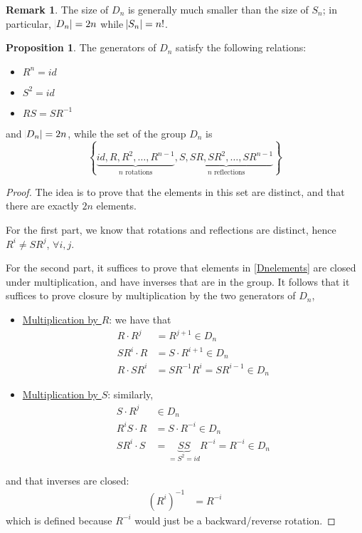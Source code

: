 \documentclass[11pt]{amsart} %
\theoremstyle{definition}
\newtheorem{proposition}[definition]{Proposition}
\theoremstyle{definition}
\newtheorem{remark}[definition]{Remark}
\numberwithin{equation}{section}
\begin{document}
\begin{remark}
	The size of $D_n$ is generally much smaller than the size of $S_n$; in particular, $\abs{D_n} = 2n$ while $\abs{S_n}=n!$.
\end{remark}

\begin{proposition}
	The generators of $D_n$ satisfy the following relations:
	\begin{itemize}%
		\item $R^n = id$
		\item $S^2 = id$
		\item $RS = SR^{-1}$
	\end{itemize}
	and $\abs{D_n}=2n$, while the set of the group $D_n$ is
	\begin{equation}
	\label{Dnelements}
	\left\{ \underbrace{id, R, R^2, \dots, R^{n-1}}_{n \text{ rotations}} , \underbrace{S, SR, SR^2, \dots, SR^{n-1}}_{n \text{ reflections}} \right\}
	\end{equation}
\end{proposition}

\begin{proof}
	The idea is to prove that the elements in this set are distinct, and that there are exactly $2n$ elements.
	
	For the first part, we know that rotations and reflections are distinct, hence $R^{i} \neq SR^{j}$, $\forall i,j$.
	
	For the second part, it suffices to prove that elements in \eqref{Dnelements} are closed under multiplication, and have inverses that are in the group. It follows that it suffices to prove closure by multiplication by the two generators of $D_n$,
	\begin{itemize}%
		\item \uline{Multiplication by $R$}: we have that
		\begin{align*}
			R \cdot R^{j} &= R^{j+1} \in D_n \\
			SR^{i} \cdot R &= S \cdot R^{i+1} \in D_n \\
			R \cdot SR^{i} &= SR^{-1} R^{i} = SR^{i-1} \in D_n
		\end{align*}
		
		\item \uline{Multiplication by $S$}: similarly,
		\begin{align*}
			S \cdot R^{j} & \in D_n \\
			R^{i} S \cdot R &= S \cdot R^{-i} \in D_n \\
			SR^{i} \cdot S &= \underbrace{SS}_{=S^2 = id} R^{-i} = R^{-i} \in D_n
		\end{align*}
	\end{itemize}
	and that inverses are closed:
	\begin{align*}
		(R^i)^{-1} &= R^{-i}
	\end{align*}
	which is defined because $R^{-i}$ would just be a backward/reverse rotation.
\end{proof}
\end{document}
